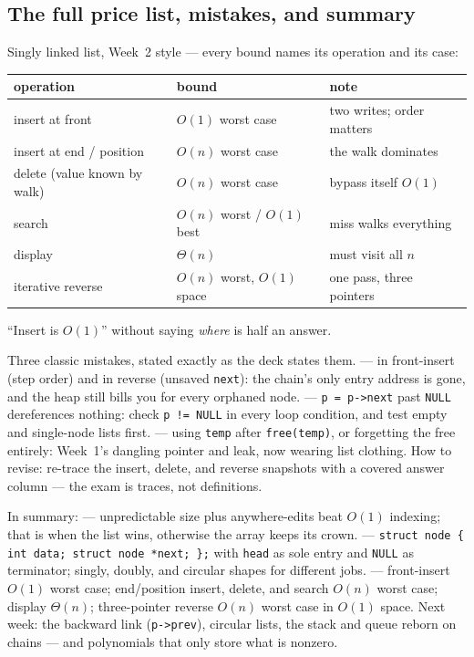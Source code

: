\documentclass[11pt]{article}
\begin{document}
\subsection{The full price list, mistakes, and summary}

Singly linked list, Week~2 style --- every bound names its operation and its case:

\begin{center}
{\footnotesize
\begin{tabular}{lll}
  \toprule
  \textbf{operation} & \textbf{bound} & \textbf{note} \\
  \midrule
  insert at front & $O(1)$ worst case & two writes; order matters \\
  insert at end / position & $O(n)$ worst case & the walk dominates \\
  delete (value known by walk) & $O(n)$ worst case & bypass itself $O(1)$ \\
  search & $O(n)$ worst / $O(1)$ best & miss walks everything \\
  display & $\Theta(n)$ & must visit all $n$ \\
  iterative reverse & $O(n)$ worst, $O(1)$ space & one pass, three pointers \\
  \bottomrule
\end{tabular}}
\end{center}

``Insert is $O(1)$'' without saying \emph{where} is half an answer.

Three classic mistakes, stated exactly as the deck states them.  --- in front-insert (step order) and in reverse (unsaved \texttt{next}): the chain's only entry address is gone, and the heap still bills you for every orphaned node.  --- \texttt{p = p->next} past \texttt{NULL} dereferences nothing: check \texttt{p != NULL} in every loop condition, and test empty and single-node lists first.  --- using \texttt{temp} after \texttt{free(temp)}, or forgetting the free entirely: Week~1's dangling pointer and leak, now wearing list clothing. How to revise: re-trace the insert, delete, and reverse snapshots with a covered answer column --- the exam is traces, not definitions.

In summary:  --- unpredictable size plus anywhere-edits beat $O(1)$ indexing; that is when the list wins, otherwise the array keeps its crown.  --- \texttt{struct node \{ int data; struct node *next; \};} with \texttt{head} as sole entry and \texttt{NULL} as terminator; singly, doubly, and circular shapes for different jobs.  --- front-insert $O(1)$ worst case; end/position insert, delete, and search $O(n)$ worst case; display $\Theta(n)$; three-pointer reverse $O(n)$ worst case in $O(1)$ space. Next week: the backward link (\texttt{p->prev}), circular lists, the stack and queue reborn on chains --- and polynomials that only store what is nonzero.
\end{document}
